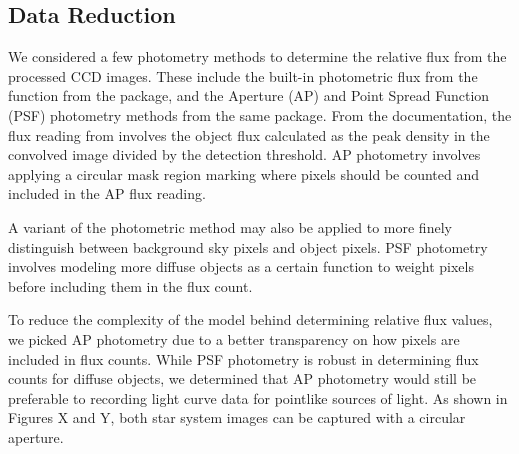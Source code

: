 \documentclass[12pt]{article}
\begin{document}
\subsection{Data Reduction}
We considered a few photometry methods to determine the relative flux from the processed CCD images. These include the built-in photometric flux from the  function from the  package, and the Aperture (AP) and Point Spread Function (PSF) photometry methods from the same  package. From the  documentation, the flux reading from  involves the object flux calculated as the peak density in the convolved image divided by the detection threshold. AP photometry involves applying a circular mask region marking where pixels should be counted and included in the AP flux reading. 

A  variant of the photometric method may also be applied to more finely distinguish between background sky pixels and object pixels. PSF photometry involves modeling more diffuse objects as a certain function to weight pixels before including them in the flux count. 

To reduce the complexity of the model behind determining relative flux values, we picked AP photometry due to a better transparency on how pixels are included in flux counts. While PSF photometry is robust in determining flux counts for diffuse objects, we determined that AP photometry would still be preferable to recording light curve data for pointlike sources of light. As shown in Figures X and Y, both star system images can be captured with a circular aperture.
\end{document}
